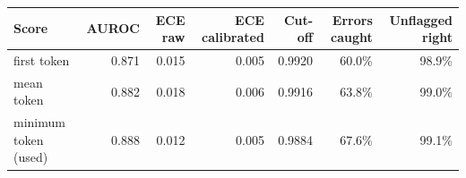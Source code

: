 \begin{tabular}{@{}lrrrrrr@{}}
\toprule
Score & AUROC & ECE raw & ECE calibrated & Cut-off & Errors caught & Unflagged right \\
\midrule
first token & 0.871 & 0.015 & 0.005 & 0.9920 & 60.0\% & 98.9\% \\
mean token & 0.882 & 0.018 & 0.006 & 0.9916 & 63.8\% & 99.0\% \\
minimum token (used) & 0.888 & 0.012 & 0.005 & 0.9884 & 67.6\% & 99.1\% \\
\bottomrule
\end{tabular}
